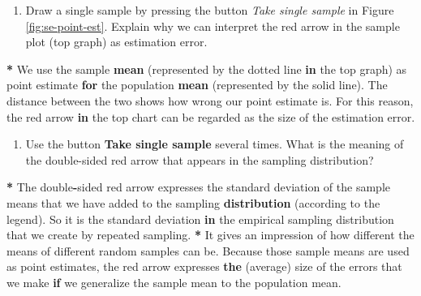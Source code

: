 \documentclass[a4paper]{book}
\newenvironment{Shaded}{\begin{snugshade}}{\end{snugshade}}
\newcommand{\KeywordTok}[1]{\textcolor[rgb]{0,0,0}{\textbf{#1}}}
\newcommand{\StringTok}[1]{\textcolor[rgb]{0.00,0.00,0.00}{#1}}
\newcommand{\ControlFlowTok}[1]{\textcolor[rgb]{0.00,0.00,0.00}{\textbf{#1}}}
\newcommand{\OperatorTok}[1]{\textcolor[rgb]{0.00,0.00,0.00}{\textbf{#1}}}
\newcommand{\NormalTok}[1]{#1}
\providecommand{\tightlist}{%
  \setlength{\itemsep}{0pt}\setlength{\parskip}{0pt}}
\theoremstyle{definition}
\theoremstyle{definition}
\theoremstyle{definition}
\theoremstyle{remark}
\begin{document}
\begin{enumerate}
\def\labelenumi{\arabic{enumi}.}
\tightlist
\item
  Draw a single sample by pressing the button \emph{Take single sample}
  in Figure \ref{fig:se-point-est}. Explain why we can interpret the red
  arrow in the sample plot (top graph) as estimation error.
\end{enumerate}

\begin{Shaded}
\begin{Highlighting}[]
\OperatorTok{*}\StringTok{ }\NormalTok{We use the sample }\KeywordTok{mean}\NormalTok{ (represented by the dotted line }\ControlFlowTok{in}\NormalTok{ the top graph) as}
\NormalTok{point estimate }\ControlFlowTok{for}\NormalTok{ the population }\KeywordTok{mean}\NormalTok{ (represented by the solid line). The}
\NormalTok{distance between the two shows how wrong our point estimate is. For this}
\NormalTok{reason, the red arrow }\ControlFlowTok{in}\NormalTok{ the top chart can be regarded as the size of the}
\NormalTok{estimation error.}
\end{Highlighting}
\end{Shaded}

\begin{enumerate}
\def\labelenumi{\arabic{enumi}.}
\setcounter{enumi}{1}
\tightlist
\item
  Use the button \textbf{Take single sample} several times. What is the
  meaning of the double-sided red arrow that appears in the sampling
  distribution?
\end{enumerate}

\begin{Shaded}
\begin{Highlighting}[]
\OperatorTok{*}\StringTok{ }\NormalTok{The double}\OperatorTok{-}\NormalTok{sided red arrow expresses the standard deviation of the sample}
\NormalTok{means that we have added to the sampling }\KeywordTok{distribution}\NormalTok{ (according to the}
\NormalTok{legend). So it is the standard deviation }\ControlFlowTok{in}\NormalTok{ the empirical sampling}
\NormalTok{distribution that we create by repeated sampling.}
\OperatorTok{*}\StringTok{ }\NormalTok{It gives an impression of how different the means of different random}
\NormalTok{samples can be. Because those sample means are used as point estimates, the}
\NormalTok{red arrow expresses }\KeywordTok{the}\NormalTok{ (average) size of the errors that we make }\ControlFlowTok{if}\NormalTok{ we}
\NormalTok{generalize the sample mean to the population mean.}
\end{Highlighting}
\end{Shaded}
\end{document}
